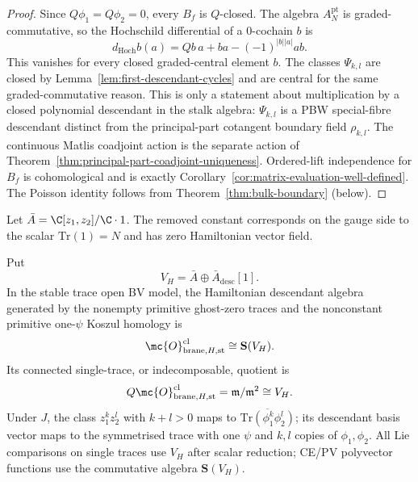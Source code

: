 \documentclass[11pt]{memoir}
\begin{document}
\begin{proof}
  Since $Q\phi_1=Q\phi_2=0$, every $B_f$ is $Q$-closed. The algebra
  $A_N^{\mathrm{pt}}$ is graded-commutative, so the Hochschild differential of
  a $0$-cochain $b$ is
  $$d_{\mathrm{Hoch}}b(a)=Qb\,a+
    ba-(-1)^{|b||a|}ab.$$
	  This vanishes for every closed graded-central element $b$. The classes
	  $\Psi_{k,l}$ are closed by Lemma~\ref{lem:first-descendant-cycles} and are
	  central for the same graded-commutative reason. This is only a statement
	  about multiplication by a closed polynomial descendant in the stalk algebra:
	  \(\Psi_{k,l}\) is a PBW special-fibre descendant distinct from the
	  principal-part cotangent boundary field \(\rho_{k,l}\).  The continuous
	  Matlis coadjoint action is the separate action of
	  Theorem~\ref{thm:principal-part-coadjoint-uniqueness}. Ordered-lift
	  independence for \(B_f\) is cohomological and is exactly
	  Corollary~\ref{cor:matrix-evaluation-well-defined}. The Poisson identity
	  follows from Theorem~\ref{thm:bulk-boundary} (below).
	\end{proof}

Let $\bar A=\C[z_1,z_2]/\C\cdot1$. The removed constant corresponds on the
gauge side to the scalar $\mathrm{Tr}(1)=N$ and has zero Hamiltonian vector
field.

\begin{prop}\label{prop:brane-ops}
  Put
  \[
    V_H=\bar A\oplus\bar A_{\mathrm{desc}}[1].
  \]
  In the stable trace open BV model, the Hamiltonian descendant algebra
  generated by the nonempty primitive ghost-zero traces and the nonconstant
  primitive one-\(\psi\) Koszul homology is
  \[
    \mc{O}^{\mathrm{cl}}_{\mathrm{brane},H,\mathrm{st}}
      \cong \mathbf S(V_H).
  \]
  Its connected single-trace, or indecomposable, quotient is
  \[
    Q\mc{O}^{\mathrm{cl}}_{\mathrm{brane},H,\mathrm{st}}
      =\mathfrak m/\mathfrak m^2\cong V_H.
  \]
	  Under \(J\), the class \(z_1^kz_2^l\) with \(k+l>0\) maps to
	  \(\overline{\mathrm{Tr}(\phi_1^k\phi_2^l)}\); its descendant basis
	  vector maps to the symmetrised trace with one \(\psi\) and
	  \(k,l\) copies of \(\phi_1,\phi_2\).  All Lie comparisons on single traces use \(V_H\)
	  after scalar reduction; CE/PV polyvector functions use the commutative
	  algebra \(\mathbf S(V_H)\).
\end{prop}
\end{document}
